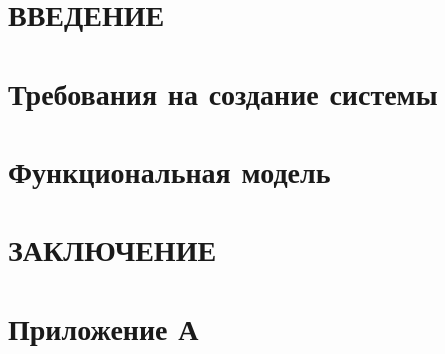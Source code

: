 \documentclass[
    a4paper,
    14pt,
    twoside,
]{extarticle}
\begin{document}

\setcounter{page}{2}

\tableofcontents

\newpage
\section*{\MakeUppercase{Введение}}\label{sec:introduction}


\newpage
\section{Требования на создание системы}






\section{Функциональная модель}


\newpage
\section*{\MakeUppercase{Заключение}}\label{sec:conclusion}


\newpage
\section*{Приложение А}\label{appendix-1}

\setcounter{table}{0}
\renewcommand{\thetable}{A.\arabic{table}}

\end{document}
